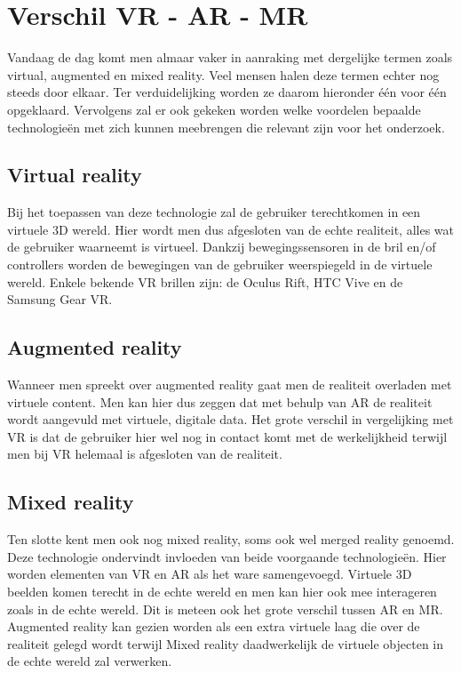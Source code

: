 \section{Verschil VR - AR - MR}
Vandaag de dag komt men almaar vaker in aanraking met dergelijke termen zoals virtual, augmented en mixed reality. Veel mensen halen deze termen echter nog steeds door elkaar. Ter verduidelijking worden ze daarom hieronder één voor één opgeklaard. Vervolgens zal er ook  gekeken worden welke voordelen bepaalde technologieën met zich kunnen meebrengen die relevant zijn voor het onderzoek. 

\subsection{Virtual reality}
Bij het toepassen van deze technologie zal de gebruiker terechtkomen in een virtuele 3D wereld. Hier wordt men dus afgesloten van de echte realiteit, alles wat de gebruiker waarneemt is virtueel. Dankzij bewegingssensoren in de bril en/of controllers worden de bewegingen van de gebruiker weerspiegeld in de virtuele wereld. Enkele bekende VR brillen zijn: de Oculus Rift, HTC Vive en de Samsung Gear VR.

\subsection{Augmented reality}
Wanneer men spreekt over augmented reality gaat men de realiteit overladen met virtuele content. Men kan hier dus zeggen dat met behulp van AR de realiteit wordt aangevuld met virtuele, digitale data. Het grote verschil in vergelijking met VR is dat de gebruiker hier wel nog in contact komt met de werkelijkheid terwijl men bij VR helemaal is afgesloten van de realiteit.

\subsection{Mixed reality}
Ten slotte kent men ook nog mixed reality, soms ook wel merged reality genoemd. Deze technologie ondervindt invloeden van beide voorgaande technologieën. Hier worden elementen van VR en AR als het ware samengevoegd. Virtuele 3D beelden komen terecht in de echte wereld en men kan hier ook mee interageren zoals in de echte wereld. Dit is meteen ook het grote verschil tussen AR en MR. Augmented reality kan gezien worden als een extra virtuele laag die over de realiteit gelegd wordt terwijl Mixed reality daadwerkelijk de virtuele objecten in de echte wereld zal verwerken.

